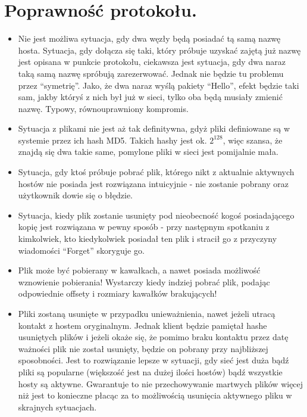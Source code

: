 \documentclass[10pt,a4paper]{article}
\begin{document}
\section{Poprawność protokołu.}
\begin{itemize}
\item Nie jest możliwa sytuacja, gdy dwa węzły będą posiadać tą samą nazwę hosta. Sytuacja, gdy dołącza się taki, który próbuje uzyskać zajętą już nazwę jest opisana w punkcie protokołu, ciekawsza jest sytuacja, gdy dwa naraz taką samą nazwę spróbują zarezerwować. Jednak nie będzie tu problemu przez “symetrię”. Jako, że dwa naraz wyślą pakiety “Hello”, efekt będzie taki sam, jakby któryś z nich był już w sieci, tylko oba będą musiały zmienić nazwę. Typowy, równouprawniony kompromis.
\item Sytuacja z plikami nie jest aż tak definitywna, gdyż pliki definiowane są w systemie przez ich hash MD5. Takich hashy jest ok. $2^{128}$, więc szansa, że znajdą się dwa takie same, pomylone pliki w sieci jest pomijalnie mała. 
\item Sytuacja, gdy ktoś próbuje pobrać plik, którego nikt z aktualnie aktywnych hostów nie posiada jest rozwiązana intuicyjnie - nie zostanie pobrany oraz użytkownik dowie się o błędzie.
\item Sytuacja, kiedy plik zostanie usunięty pod nieobecność kogoś posiadającego kopię jest rozwiązana w pewny sposób - przy następnym spotkaniu z kimkolwiek, kto kiedykolwiek posiadał ten plik i stracił go z przyczyny wiadomości “Forget” skoryguje go.
\item Plik może być pobierany w kawałkach, a nawet posiada możliwość wznowienie pobierania! Wystarczy kiedy indziej pobrać plik, podając odpowiednie offsety i rozmiary kawałków brakujących!
\item Pliki zostaną usunięte w przypadku unieważnienia, nawet jeżeli utracą kontakt z hostem oryginalnym. Jednak klient będzie pamiętał hashe usuniętych plików i jeżeli okaże się, że pomimo braku kontaktu przez datę ważności plik nie został usunięty, będzie on pobrany przy najbliższej sposobności. Jest to rozwiązanie lepsze w sytuacji, gdy sieć jest duża bądź pliki są popularne (większość jest na dużej ilości hostów) bądź wszystkie hosty są aktywne. Gwarantuje to nie przechowywanie martwych plików więcej niż jest to konieczne płacąc za to możliwością usunięcia aktywnego pliku w skrajnych sytuacjach.
\end{itemize}
\end{document}

